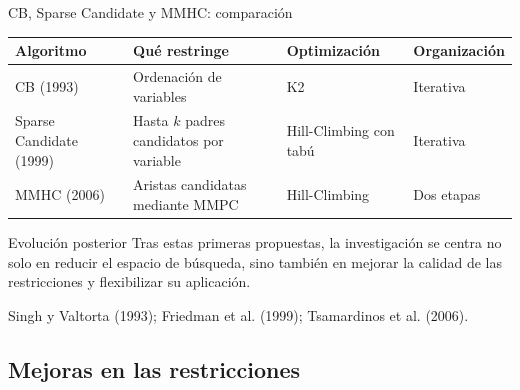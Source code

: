 \documentclass[aspectratio=169,11pt]{beamer}
\begin{document}
\begin{frame}[t]{CB, Sparse Candidate y MMHC: comparación}
  \small
  \renewcommand{\arraystretch}{1.32}
  \setlength{\tabcolsep}{4pt}

  \begin{tabular}{@{}
    >{\raggedright\arraybackslash}p{}
    >{\raggedright\arraybackslash}p{}
    >{\raggedright\arraybackslash}p{}
    >{\raggedright\arraybackslash}p{}
    @{}}
    \toprule
    \textbf{Algoritmo} & \textbf{Qué restringe} &
    \textbf{Optimización} & \textbf{Organización} \\
    \midrule

    CB (1993) &
    Ordenación de variables &
    K2 &
    Iterativa \\

    \addlinespace

    Sparse Candidate (1999) &
    Hasta $k$ padres candidatos por variable &
    Hill-Climbing con tabú &
    Iterativa \\

    \addlinespace

    MMHC (2006) &
    Aristas candidatas mediante MMPC &
    Hill-Climbing &
    Dos etapas \\

    \bottomrule
  \end{tabular}

  \vspace{0.35cm}

  \begin{block}{Evolución posterior}
    Tras estas primeras propuestas, la investigación se centra no solo en reducir el espacio de búsqueda, sino también en mejorar la calidad de las restricciones y flexibilizar su aplicación.
  \end{block}

  \vspace{0.15cm}

  {\scriptsize\color{upmgray}
  Singh y Valtorta (1993); Friedman et al. (1999);
  Tsamardinos et al. (2006).}
\end{frame}

\subsection{Mejoras en las restricciones}
\end{document}
